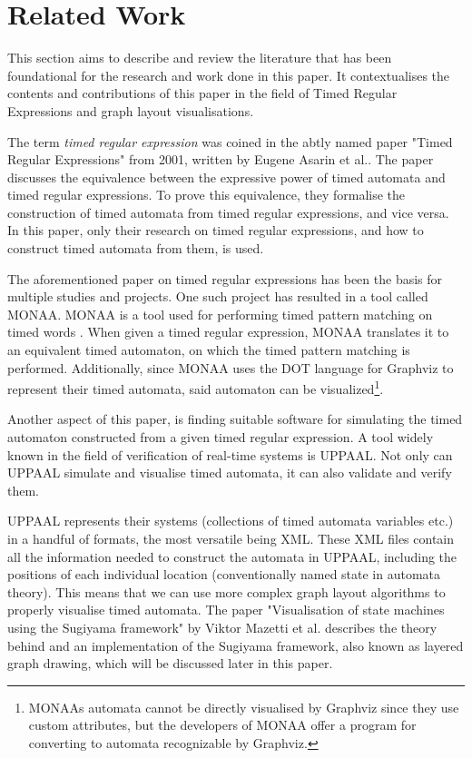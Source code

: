 \section{Related Work}



This section aims to describe and review the literature that has been foundational for the research and work done in this paper. It contextualises the contents and contributions of this paper in the field of Timed Regular Expressions and graph layout visualisations.

The term \textit{timed regular expression} was coined in the abtly named paper "Timed Regular Expressions" from 2001, written by Eugene Asarin et al.\cite{Eugene2001}. The paper discusses the equivalence between the expressive power of timed automata\cite{ALUR1994} and timed regular expressions. To prove this equivalence, they formalise the construction of timed automata from timed regular expressions, and vice versa. In this paper, only their research on timed regular expressions, and how to construct timed automata from them, is used.

The aforementioned paper on timed regular expressions has been the basis for multiple studies and projects. One such project has resulted in a tool called MONAA. MONAA is a tool used for performing timed pattern matching on timed words \cite{MONAA2017}. When given a timed regular expression, MONAA translates it to an equivalent timed automaton, on which the timed pattern matching is performed. Additionally, since MONAA uses the DOT language for Graphviz \cite{Graphviz} to represent their timed automata, said automaton can be visualized\footnote{MONAAs automata cannot be directly visualised by Graphviz since they use custom attributes, but the developers of MONAA offer a program for converting to automata recognizable by Graphviz\cite{MONAA2017}.}.

Another aspect of this paper, is finding suitable software for simulating the timed automaton constructed from a given timed regular expression. A tool widely known in the field of verification of real-time systems is UPPAAL. Not only can UPPAAL simulate and visualise timed automata, it can also validate and verify them\cite{UPPAAL}.

UPPAAL represents their systems (collections of timed automata variables etc.) in a handful of formats, the most versatile being XML\cite{UPPAAL}. These XML files contain all the information needed to construct the automata in UPPAAL, including the positions of each individual location (conventionally named state in automata theory). This means that we can use more complex graph layout algorithms to properly visualise timed automata. The paper "Visualisation of state machines using the Sugiyama framework" by Viktor Mazetti et al. describes the theory behind and an implementation of the Sugiyama framework, also known as layered graph drawing, which will be discussed later in this paper.